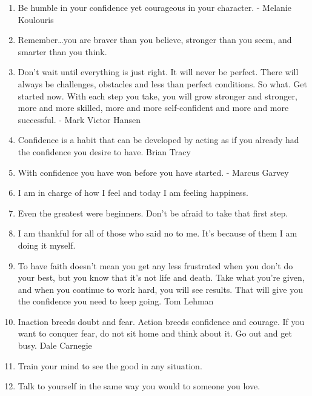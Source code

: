 \begin{enumerate}
            \item Be humble in your confidence yet courageous in your character. - Melanie Koulouris

            \item Remember…you are braver than you believe, stronger than you seem, and smarter than you think.

            \item Don’t wait until everything is just right. It will never be perfect. There will always be challenges, obstacles and less than perfect conditions. So what. Get started now. With each step you take, you will grow stronger and stronger, more and more skilled, more and more self-confident and more and more successful. - Mark Victor Hansen

            \item Confidence is a habit that can be developed by acting as if you already had the confidence you desire to have. Brian Tracy

            \item With confidence you have won before you have started. - Marcus Garvey

            \item I am in charge of how I feel and today I am feeling happiness.

            \item Even the greatest were beginners. Don’t be afraid to take that first step.

            \item I am thankful for all of those who said no to me. It’s because of them I am doing it myself.

            \item To have faith doesn’t mean you get any less frustrated when you don’t do your best, but you know that it’s not life and death. Take what you’re given, and when you continue to work hard, you will see results. That will give you the confidence you need to keep going. Tom Lehman

            \item Inaction breeds doubt and fear. Action breeds confidence and courage. If you want to conquer fear, do not sit home and think about it. Go out and get busy. Dale Carnegie

            \item Train your mind to see the good in any situation.

            \item Talk to yourself in the same way you would to someone you love.


\end{enumerate}
